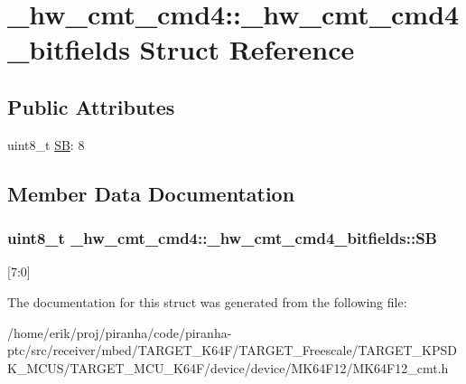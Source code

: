 \hypertarget{struct__hw__cmt__cmd4_1_1__hw__cmt__cmd4__bitfields}{}\section{\+\_\+hw\+\_\+cmt\+\_\+cmd4\+:\+:\+\_\+hw\+\_\+cmt\+\_\+cmd4\+\_\+bitfields Struct Reference}
\label{struct__hw__cmt__cmd4_1_1__hw__cmt__cmd4__bitfields}
\subsection*{Public Attributes}
\begin{DoxyCompactItemize}
\item 
uint8\+\_\+t \hyperlink{struct__hw__cmt__cmd4_1_1__hw__cmt__cmd4__bitfields_a12ab6e76665680f12546077467b6c0b9}{SB}\+: 8
\end{DoxyCompactItemize}


\subsection{Member Data Documentation}
\subsubsection[{\texorpdfstring{SB}{SB}}]{\setlength{\rightskip}{0pt plus 5cm}uint8\+\_\+t \+\_\+hw\+\_\+cmt\+\_\+cmd4\+::\+\_\+hw\+\_\+cmt\+\_\+cmd4\+\_\+bitfields\+::\+SB}\hypertarget{struct__hw__cmt__cmd4_1_1__hw__cmt__cmd4__bitfields_a12ab6e76665680f12546077467b6c0b9}{}\label{struct__hw__cmt__cmd4_1_1__hw__cmt__cmd4__bitfields_a12ab6e76665680f12546077467b6c0b9}
\mbox{[}7\+:0\mbox{]} 

The documentation for this struct was generated from the following file\+:\begin{DoxyCompactItemize}
\item 
/home/erik/proj/piranha/code/piranha-\/ptc/src/receiver/mbed/\+T\+A\+R\+G\+E\+T\+\_\+\+K64\+F/\+T\+A\+R\+G\+E\+T\+\_\+\+Freescale/\+T\+A\+R\+G\+E\+T\+\_\+\+K\+P\+S\+D\+K\+\_\+\+M\+C\+U\+S/\+T\+A\+R\+G\+E\+T\+\_\+\+M\+C\+U\+\_\+\+K64\+F/device/device/\+M\+K64\+F12/M\+K64\+F12\+\_\+cmt.\+h\end{DoxyCompactItemize}
